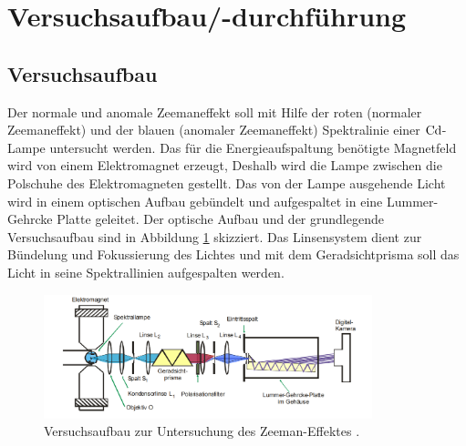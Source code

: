 \section{Versuchsaufbau/-durchführung}

\subsection{Versuchsaufbau}

Der normale und anomale Zeemaneffekt soll mit Hilfe der roten (normaler Zeemaneffekt)
und der blauen (anomaler Zeemaneffekt) Spektralinie einer $\ce{Cd}$-Lampe untersucht werden.
Das für die Energieaufspaltung benötigte Magnetfeld wird von einem Elektromagnet erzeugt,
Deshalb wird die Lampe zwischen die Polschuhe des Elektromagneten gestellt.
Das von der Lampe ausgehende Licht wird in einem optischen Aufbau gebündelt und aufgespaltet
in eine Lummer-Gehrcke Platte geleitet. Der optische Aufbau und der grundlegende Versuchsaufbau
sind in Abbildung \ref{fig: versuchsaufbau} skizziert. Das Linsensystem dient zur Bündelung und Fokussierung des Lichtes und
mit dem Geradsichtprisma soll das Licht in seine Spektrallinien aufgespalten werden.
\FloatBarrier
\begin{figure}[h]
  \centering
  \includegraphics[width=0.85\textwidth]{pics/versuchsaufbau.png}
  \caption{Versuchsaufbau zur Untersuchung des Zeeman-Effektes \cite{anleitung27}.}
  \label{fig: versuchsaufbau}
\end{figure}
\FloatBarrier


